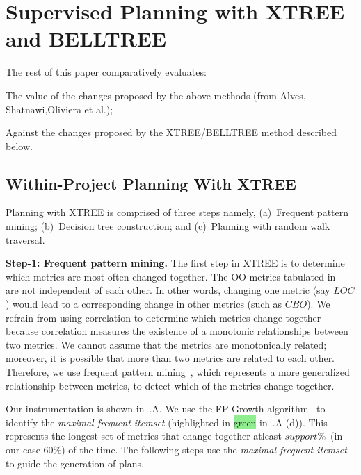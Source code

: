 \section{Supervised Planning with XTREE and BELLTREE}

 
 The rest of this paper comparatively evaluates:
 \bi
 \item
The value of the changes proposed
by the above methods (from Alves, Shatnawi,Oliviera et al.);
 \item
Against the changes proposed by the   XTREE/BELLTREE method described below.
\ei

\subsection{Within-Project Planning With XTREE}
\label{sect:XTREE}

Planning with XTREE is comprised of three steps namely, (a)~Frequent pattern mining; (b)~Decision tree construction; and (c)~Planning with random walk traversal. 

\noindent\textbf{Step-1: Frequent pattern mining.} The first step in XTREE is to determine which metrics are most often changed together. The OO metrics tabulated in~ are not independent of each other. In other words, changing one metric (say $\mathit{LOC}$) would lead to a corresponding change in other metrics (such as $\mathit{CBO}$).  {\color{steel} We refrain from using correlation to determine which metrics change together because correlation measures the existence of a monotonic relationships between two metrics. We cannot assume that the metrics are monotonically related; moreover, it is possible that more than two metrics are related to each other. Therefore, we use frequent pattern mining~\citep{han2007frequent}, which represents a more generalized relationship between metrics, to detect which of the metrics change together.}  

Our instrumentation is shown in~.A. We use the FP-Growth algorithm~\citep{han2007frequent} to identify the \textit{maximal frequent itemset} (highlighted in \colorbox{lightgreen}{green} in~.A-(d)). This represents the longest set of metrics that change together atleast $\mathit{support}\%$~(in our case $60\%$) of the time. The following steps use the \textit{maximal frequent itemset} to guide the generation of plans.  


